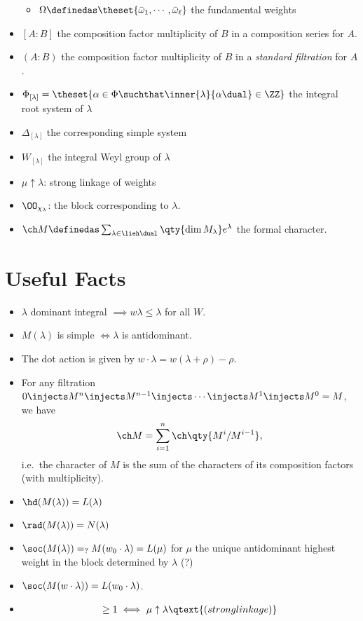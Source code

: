 \begin{itemize}
  \begin{itemize}
  \tightlist
  \item
    \(\Omega \definedas \theset{\bar \omega_1, \cdots, \bar \omega_\ell}\)
    the fundamental weights
  \end{itemize}
\item
  \([A: B]\) the composition factor multiplicity of \(B\) in a
  composition series for \(A\).
\item
  \((A: B)\) the composition factor multiplicity of \(B\) in a
  \emph{standard filtration} for \(A\).
\item
  \(\Phi_{[\lambda]} = \theset{\alpha\in \Phi \suchthat \inner{\lambda}{\alpha\dual} \in \ZZ}\)
  the integral root system of \(\lambda\)
\item
  \(\Delta_{[\lambda]}\) the corresponding simple system
\item
  \(W_{[\lambda]}\) the integral Weyl group of \(\lambda\)
\item
  \(\mu \uparrow \lambda\): strong linkage of weights
\item
  \(\OO_{\chi_\lambda}\): the block corresponding to \(\lambda\).
\item
  \(\ch M \definedas \sum_{\lambda \in \lieh\dual} \qty{\dim M_\lambda} e^{\lambda}\)
  the formal character.
\end{itemize}

\hypertarget{useful-facts}{%
\section{Useful Facts}\label{useful-facts}}

\begin{itemize}
\tightlist
\item
  \(\lambda\) dominant integral \(\implies w\lambda \leq \lambda\) for
  all \(W\).
\item
  \(M(\lambda)\) is simple \(\iff \lambda\) is antidominant.
\item
  The dot action is given by
  \(w\cdot \lambda = w(\lambda + \rho) - \rho\).
\item
  For any filtration
  \(0 \injects M^n \injects M^{n-1} \injects \cdots \injects M^1 \injects M^0 = M\),
  we have
  \begin{align*}\ch M = \sum_{i=1}^n \ch \qty{M^i/M^{i-1}},\end{align*}
  i.e.~the character of \(M\) is the sum of the characters of its
  composition factors (with multiplicity).
\item
  \(\hd(M(\lambda)) = L(\lambda)\)
\item
  \(\rad(M(\lambda)) = N(\lambda)\)
\item
  \(\soc(M(\lambda)) =_? M(w_0 \cdot \lambda) = L(\mu)\) for \(\mu\) the
  unique antidominant highest weight in the block determined by
  \(\lambda\) (?)
\item
  \(\soc(M(w \cdot \lambda)) = L(w_0 \cdot \lambda)\).
\item

  \begin{align*}[M(\lambda) : L(\mu)] \geq 1 \iff \mu \uparrow \lambda \qtext{(strong linkage)}\end{align*}
\end{itemize}

